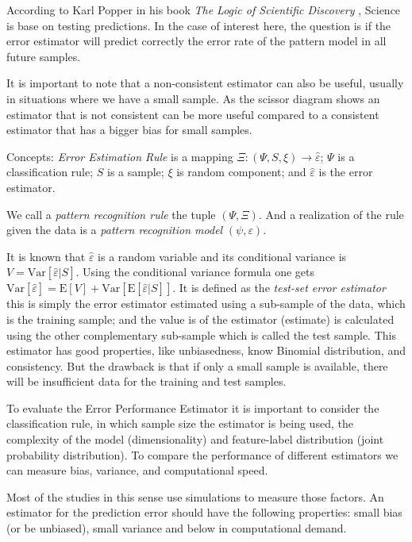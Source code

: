 \documentclass[9pt,a4paper]{article}
\newcommand{\E}{\mathrm{E}}
\newcommand{\Var}{\mathrm{Var}}
\begin{document}
According to Karl Popper in his book \textit{The Logic of Scientific Discovery} \citep{popper}, Science is base on testing predictions. 
In the case of interest here, the question is if the error estimator will predict correctly the error rate of the pattern model in all future samples.



It is important to note that a non-consistent estimator can also be useful, usually in situations where we have a small sample. 
As the scissor diagram shows an estimator that is not consistent can be more useful compared to a consistent estimator that has a bigger bias for small samples. 

Concepts: \textit{Error Estimation Rule} is a mapping $ \Xi: (\Psi, S, \xi  )  \rightarrow \hat{\varepsilon} $; $  \Psi $ is a classification rule; $S$ is a sample; $\xi$ is random component; and $ \hat{\varepsilon} $ is the error estimator. 
 
We call a \textit{pattern recognition rule} the tuple $(  \Psi, \Xi ) $. And a realization of the rule given the data is a \textit{pattern recognition model} $( \psi, \varepsilon)$. 

It is known that $ \hat{\varepsilon} $  is a random variable and its conditional variance is $  V =  \Var[ \hat{\varepsilon} | S  ]$. Using the conditional variance formula one gets $  \Var[\hat{\varepsilon}] = \E[V] + \Var[ \E[\hat{\varepsilon} | S   ]]$. 
It is defined as the \textit{test-set error estimator} this is simply the error estimator estimated using a sub-sample of the data, which is the training sample; and the value is of the estimator (estimate) is calculated using the other complementary sub-sample which is called the test sample.
This estimator has good properties, like unbiasedness, know Binomial distribution, and consistency. But the drawback is that if only a small sample is available, there will be insufficient data for the training and test samples.

To evaluate the Error Performance Estimator it is important to consider the classification rule, in which sample size the estimator is being used, the complexity of the model (dimensionality) and feature-label distribution (joint probability distribution).  To compare the performance of different estimators we can measure bias, variance, and computational speed. 

Most of the studies in this sense use simulations to measure those factors. An estimator for the prediction error should have the following properties: small bias (or be unbiased), small variance and below in computational demand. 
\end{document}
